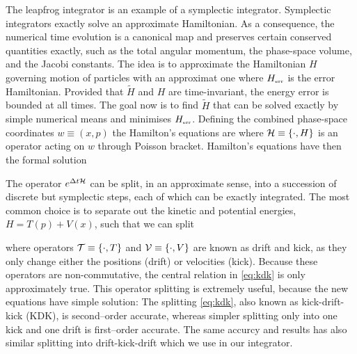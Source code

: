 The leapfrog integrator is an example of a symplectic integrator. Symplectic integrators exactly solve an approximate Hamiltonian. As a consequence, the numerical time evolution is a canonical map and preserves certain conserved quantities exactly, such as the total angular momentum, the phase-space volume, and the Jacobi constants. The idea is to approximate the Hamiltonian \(H\) governing motion of particles with an approximat one
where \(H_\text{\tiny err}\) is the error Hamiltonian. Provided that \(\tilde H\) and \(H\) are time-invariant, the energy error is bounded at all times. The goal now is to find \(\tilde H\) that can be solved exactly by simple numerical means and minimises \(H_\text{\tiny err}\). Defining the combined phase-space coordinates \(w\equiv(x,p)\) the Hamilton’s equations are
where \(\mathcal{H}\equiv\{\cdot,H\}\) is an operator acting on \(w\) through Poisson bracket. Hamilton’s equations have then the formal solution
\begin{sloppypar}
The operator \(e^{\Delta t\mathcal{H}}\) can be split, in an approximate sense, into a succession of discrete but symplectic steps, each of which can be exactly integrated. The most common choice is to separate out the kinetic and potential energies, \({H=T(p)+V(x)}\), such that we can split
\end{sloppypar}
where operators \(\mathcal{T}\equiv\{\cdot,T\}\) and \(\mathcal{V}\equiv\{\cdot,V\}\) are known as drift and kick, as they only change either the positions (drift) or velocities (kick). Because these operators are non-commutative, the central relation in \eqref{eq:kdk} is only approximately true. This operator splitting is extremely useful, because the new equations have simple solution:
The splitting \eqref{eq:kdk}, also known as kick-drift-kick (KDK), is second--order accurate, whereas simpler splitting only into one kick and one drift is first--order accurate. The same accurcy and results has also similar splitting into drift-kick-drift which we use in our integrator.
